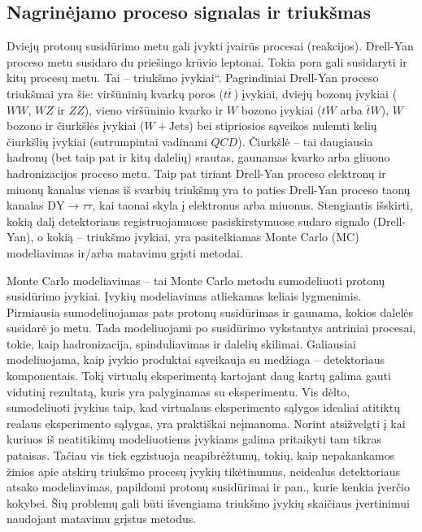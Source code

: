 \documentclass[a4paper, 12pt, oneside]{article}
\newcommand{\WJets}{W\! +\!\mathrm{Jets}}
\newcommand{\DYtau}{\mathrm{DY} \! \rightarrow \! \tau\tau}
\newcommand{\ltq}[1]{{\quotedblbase{}#1\textquotedblleft{}}}
\newcommand{\QCD}{QC\! D}
\newlength\q
\begin{document}
\subsection{Nagrinėjamo proceso signalas ir triukšmas}

Dviejų protonų susidūrimo metu gali įvykti įvairūs procesai (reakcijos).
Drell-Yan proceso metu susidaro du priešingo krūvio leptonai.
Tokia pora gali susidaryti ir kitų procesų metu.
Tai -- \ltq{triukšmo įvykiai}.
Pagrindiniai Drell-Yan proceso triukšmai yra šie: viršūninių kvarkų poros ($t\bar{t}\,$) įvykiai, dviejų bozonų
įvykiai ($WW$, $WZ$ ir $ZZ$), vieno viršūninio kvarko ir $W$ bozono įvykiai ($tW$ arba $\bar{t}W$), $W$ bozono
ir čiurkšlės įvykiai ($\WJets$) bei stipriosios sąveikos nulemti kelių čiurkšlių įvykiai (sutrumpintai vadinami $\QCD$).
Čiurkšlė -- tai daugiausia hadronų (bet taip pat ir kitų dalelių) srautas, gaunamas kvarko arba gliuono hadronizacijos
proceso metu.
Taip pat tiriant Drell-Yan proceso elektronų ir miuonų kanalus vienas iš svarbių triukšmų yra
to paties Drell-Yan proceso taonų kanalas $\DYtau$, kai taonai skyla į elektronus arba miuonus.
Stengiantis išskirti, kokią dalį detektoriaus registruojamuose pasiskirstymuose sudaro signalo (Drell-Yan),
o kokią -- triukšmo įvykiai, yra pasitelkiamas Monte Carlo (MC) modeliavimas ir/arba matavimu grįsti metodai.

Monte Carlo modeliavimas -- tai Monte Carlo metodu sumodeliuoti protonų susidūrimo įvykiai.
Įvykių modeliavimas atliekamas keliais lygmenimis.
Pirmiausia sumodeliuojamas pats protonų susidūrimas ir gaunama, kokios dalelės susidarė jo metu.
Tada modeliuojami po susidūrimo vykstantys antriniai procesai, tokie, kaip hadronizacija, spinduliavimas ir dalelių skilimai.
Galiausiai modeliuojama, kaip įvykio produktai sąveikauja su medžiaga -- detektoriaus komponentais.
Tokį virtualų eksperimentą kartojant daug kartų galima gauti vidutinį rezultatą, kuris yra palyginamas su eksperimentu.
Vis dėlto, sumodeliuoti įvykius taip, kad virtualaus eksperimento sąlygos idealiai atitiktų realaus eksperimento sąlygas,
yra praktiškai neįmanoma.
Norint atsižvelgti į kai kuriuos iš neatitikimų modeliuotiems įvykiams galima pritaikyti tam tikras pataisas.
Tačiau vis tiek egzistuoja neapibrėžtumų, tokių, kaip nepakankamos žinios apie atskirų triukšmo procesų įvykių tikėtinumus,
neidealus detektoriaus atsako modeliavimas, papildomi protonų susidūrimai ir pan., kurie kenkia įverčio kokybei.
Šių problemų gali būti išvengiama triukšmo įvykių skaičiaus įvertinimui naudojant matavimu grįstus metodus.
\end{document}
